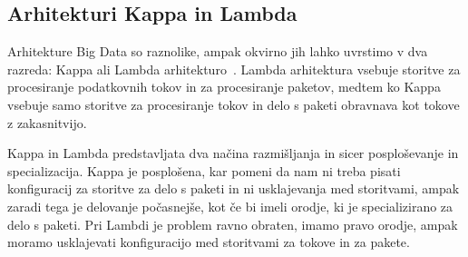 \subsection{Arhitekturi Kappa in Lambda}

Arhitekture Big Data so raznolike,
ampak okvirno jih lahko uvrstimo v dva razreda: Kappa ali Lambda arhitekturo~\cite{kappa_lambda}.
Lambda arhitektura vsebuje storitve za procesiranje podatkovnih tokov
in za procesiranje paketov, medtem ko Kappa vsebuje samo storitve za
procesiranje tokov in delo s paketi obravnava kot tokove z zakasnitvijo.

Kappa in Lambda predstavljata dva načina razmišljanja in sicer posploševanje in
specializacija.
Kappa je posplošena, kar pomeni da nam ni treba pisati konfiguracij
za storitve za delo s paketi in ni usklajevanja med storitvami,
ampak zaradi tega je delovanje počasnejše, kot če bi imeli orodje,
ki je specializirano za delo s paketi.
Pri Lambdi je problem ravno obraten, imamo pravo orodje,
ampak moramo usklajevati konfiguracijo med storitvami za tokove in za pakete.